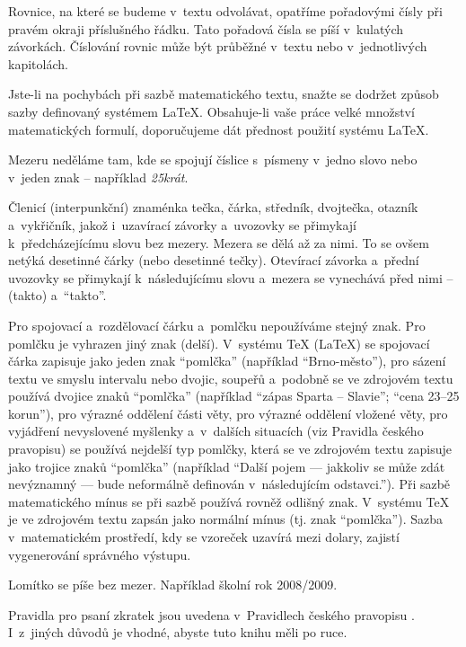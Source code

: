 Rovnice, na které se budeme v~textu odvolávat, opatříme pořadovými čísly při pravém okraji příslušného řádku. Tato pořadová čísla se píší v~kulatých závorkách. Číslování rovnic může být průběžné v~textu nebo v~jednotlivých kapitolách.

Jste-li na pochybách při sazbě matematického textu, snažte se dodržet způsob sazby definovaný systémem LaTeX. Obsahuje-li vaše práce velké množství matematických formulí, doporučujeme dát přednost použití systému LaTeX.

Mezeru neděláme tam, kde se spojují číslice s~písmeny v~jedno slovo nebo v~jeden znak -- například {\it 25krát}.

Členicí (interpunkční) znaménka tečka, čárka, středník, dvojtečka, otazník a~vykřičník, jakož i~uzavírací závorky a~uvozovky se přimykají k~předcházejícímu slovu bez mezery. Mezera se dělá až za nimi. To se ovšem netýká desetinné čárky (nebo desetinné tečky). Otevírací závorka a~přední uvozovky se přimykají k~následujícímu slovu a~mezera se vynechává před nimi -- (takto) a~``takto''.

Pro spojovací a~rozdělovací čárku a~pomlčku nepoužíváme stejný znak. Pro pomlčku je vyhrazen jiný znak (delší). V~systému TeX (LaTeX) se spojovací čárka zapisuje jako jeden znak ``pomlčka'' (například ``Brno-město''), pro sázení textu ve smyslu intervalu nebo dvojic, soupeřů a~podobně se ve zdrojovém textu používá dvojice znaků ``pomlčka'' (například ``zápas Sparta -- Slavie''; ``cena 23--25 korun''), pro výrazné oddělení části věty, pro výrazné oddělení vložené věty, pro vyjádření nevyslovené myšlenky a~v~dalších situacích (viz Pravidla českého pravopisu) se používá nejdelší typ pomlčky, která se ve zdrojovém textu zapisuje jako trojice znaků ``pomlčka'' (například ``Další pojem --- jakkoliv se může zdát nevýznamný --- bude neformálně definován v~následujícím odstavci.''). Při sazbě matematického mínus se při sazbě používá rovněž odlišný znak. V~systému TeX je ve zdrojovém textu zapsán jako normální mínus (tj. znak ``pomlčka''). Sazba v~matematickém prostředí, kdy se vzoreček uzavírá mezi dolary, zajistí vygenerování správného výstupu.

Lomítko se píše bez mezer. Například školní rok 2008/2009.

Pravidla pro psaní zkratek jsou uvedena v~Pravidlech českého pravopisu \cite{Pravidla}. I~z~jiných důvodů je vhodné, abyste tuto knihu měli po ruce. 


